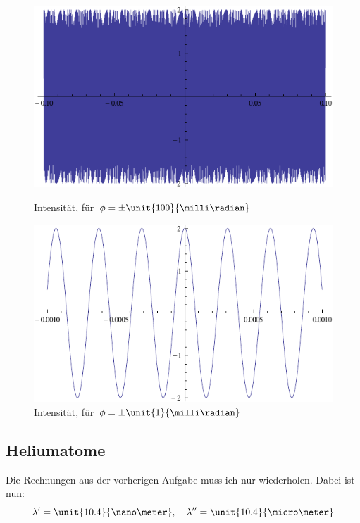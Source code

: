 \documentclass[11pt, ngerman, fleqn]{article}
\begin{document}
\begin{figure}
	\centering
	\begin{minipage}{0.45\textwidth}
		\centering
		\includegraphics[width=\textwidth]{0,1.pdf}
		\caption{Intensität, für $\phi = \pm \unit{100}{\milli\radian}$}
		\label{f1}
	\end{minipage}
	\hspace{0.08\textwidth}
	\begin{minipage}{0.45\textwidth}
		\centering
		\includegraphics[width=\textwidth]{0,001.pdf}
		\caption{Intensität, für $\phi = \pm \unit{1}{\milli\radian}$}
		\label{f2}
	\end{minipage}
\end{figure}

\subsection{Heliumatome}

Die Rechnungen aus der vorherigen Aufgabe muss ich nur wiederholen. Dabei ist
nun:
\[
	\lambda' = \unit{10.4}{\nano\meter}
	, \quad
	\lambda'' = \unit{10.4}{\micro\meter}
\]
\end{document}
